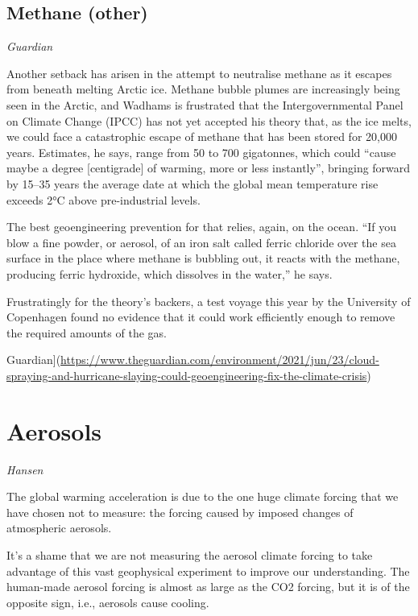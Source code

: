 \documentclass[
]{book}
\begin{document}
\hypertarget{methane-other}{%
\subsection{Methane (other)}\label{methane-other}}

\emph{Guardian}

Another setback has arisen in the attempt to neutralise methane as it escapes from beneath melting Arctic ice. Methane bubble plumes are increasingly being seen in the Arctic, and Wadhams is frustrated that the Intergovernmental Panel on Climate Change (IPCC) has not yet accepted his theory that, as the ice melts, we could face a catastrophic escape of methane that has been stored for 20,000 years. Estimates, he says, range from 50 to 700 gigatonnes, which could ``cause maybe a degree {[}centigrade{]} of warming, more or less instantly'', bringing forward by 15--35 years the average date at which the global mean temperature rise exceeds 2°C above pre-industrial levels.

The best geoengineering prevention for that relies, again, on the ocean. ``If you blow a fine powder, or aerosol, of an iron salt called ferric chloride over the sea surface in the place where methane is bubbling out, it reacts with the methane, producing ferric hydroxide, which dissolves in the water,'' he says.

Frustratingly for the theory's backers, a test voyage this year by the University of Copenhagen found no evidence that it could work efficiently enough to remove the required amounts of the gas.

Guardian{]}(\url{https://www.theguardian.com/environment/2021/jun/23/cloud-spraying-and-hurricane-slaying-could-geoengineering-fix-the-climate-crisis})

\hypertarget{aerosols}{%
\section{Aerosols}\label{aerosols}}

\emph{Hansen}

The global warming acceleration is due to the one huge climate forcing that we have chosen not to measure: the forcing caused by imposed changes of atmospheric aerosols.

It's a shame that we are not measuring the aerosol climate forcing to take advantage of this vast geophysical experiment to improve our understanding. The human-made aerosol forcing is almost as large as the CO2 forcing, but it is of the opposite sign, i.e., aerosols cause cooling.
\end{document}
